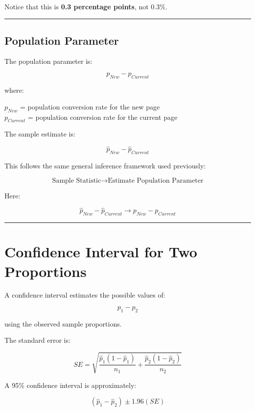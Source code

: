 \documentclass[
  letterpaper,
  DIV=11,
  numbers=noendperiod]{scrreprt}
\begin{document}
Notice that this is \textbf{0.3 percentage points}, not 0.3\%.

\begin{center}\rule{0.5\linewidth}{0.5pt}\end{center}

\section{Population Parameter}\label{population-parameter}

The population parameter is:

\[
\boxed{
p_{New}-p_{Current}
}
\]

where:

\(p_{New}\) = population conversion rate for the new page\\
\(p_{Current}\) = population conversion rate for the current page

The sample estimate is:

\[
\boxed{
\hat{p}_{New}-\hat{p}_{Current}
}
\]

This follows the same general inference framework used previously:

\[
\text{Sample Statistic}
\rightarrow
\text{Estimate Population Parameter}
\]

Here:

\[
\hat{p}_{New}-\hat{p}_{Current}
\rightarrow
p_{New}-p_{Current}
\]

\begin{center}\rule{0.5\linewidth}{0.5pt}\end{center}


\chapter{Confidence Interval for Two
Proportions}\label{confidence-interval-for-two-proportions}

A confidence interval estimates the possible values of:

\[
p_1-p_2
\]

using the observed sample proportions.

The standard error is:

\[
SE
=
\sqrt{
\frac{
\hat{p}_1(1-\hat{p}_1)
}{
n_1
}
+
\frac{
\hat{p}_2(1-\hat{p}_2)
}{
n_2
}
}
\]

A 95\% confidence interval is approximately:

\[
\boxed{
(\hat{p}_1-\hat{p}_2)
\pm
1.96(SE)
}
\]
\end{document}
